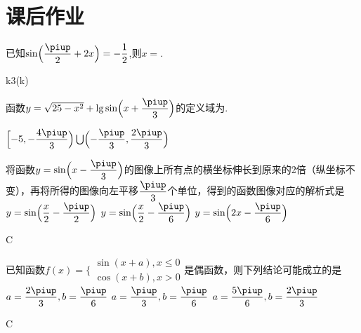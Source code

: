 \section{课后作业}
  \begin{exercise}
    \item%
      已知$\sin\Bigl(\dfrac{\piup}2+2x\Bigr)=-\dfrac12$,则$x=$\tk.
      \begin{answer}
        k\piup\pm\dfrac{\piup}3(k\in{})
      \end{answer}
    \vspace{1.5em}
    \item%
      函数$y=\sqrt{25-x^2}+\lg\sin\Bigl(x+\dfrac{\piup}3\Bigr)$的定义域为\tk.
      \begin{answer}
        $\Bigl[-5,-\dfrac{4\piup}3\Bigr)\bigcup\Bigl(-\dfrac{\piup}3,\dfrac{2\piup}3\Bigr)$
      \end{answer}
    \vspace{1.5em}
    \item%
      将函数$y=\sin\Bigl(x-\dfrac{\piup}3\Bigr)$的图像上所有点的横坐标伸长到原来的2倍（纵坐标不变），再将所得的图像向左平移$\dfrac{\piup}3$个单位，得到的函数图像对应的解析式是\xz
        {$y=\sin\Bigl(\dfrac x2-\dfrac{\piup}2\Bigr)$}
        {$y=\sin\Bigl(\dfrac{x}2-\dfrac{\piup}6\Bigr)$}
        {$y=\sin\Bigl(2x-\dfrac{\piup}6\Bigr)$}
      \begin{answer}
        C
      \end{answer}
    \vspace{1.5em}
    \item%
       已知函数$f(x)=\Bigg\{\begin{aligned}
      \sin(x+a),x\le 0\\\cos (x+b),x>0
      \end{aligned}$是偶函数，则下列结论可能成立的是\xz
        {$ a=\dfrac{2\piup}{3},b=\dfrac{\piup}{6}$}
        {$a=\dfrac{\piup}{3},b=\dfrac{\piup}{6} $}
        {$ a=\dfrac{5\piup}{6},b=\dfrac{2\piup}{3}$}
      \begin{answer}
        C
      \end{answer}

\end{exercise}
